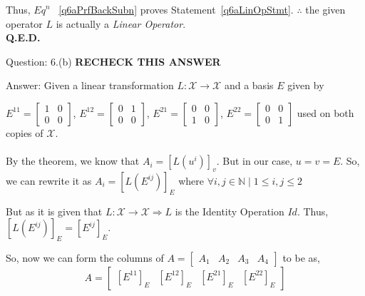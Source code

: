 \documentclass[a4paper]{article}
\begin{document}
\begin{qalist}
		Thus, ${Eq}^{n}$ ~\ref{q6aPrfBackSubn} proves Statement~\ref{q6aLinOpStmt}. $\therefore$ the given operator $L$ is actually a \textit{Linear Operator}. \\ \textbf{Q.E.D.}
		
		\item[Question: 6.(b)] \setcounter{equation}{0} \textbf{RECHECK THIS ANSWER}
		\item[Answer:] Given a linear transformation $L : \mathcal{X} \rightarrow \mathcal{X}$ and a basis $E$ given by 
		
		${E}^{11} = \begin{bmatrix}1 & 0 \\ 0 & 0 \end{bmatrix}$, ${E}^{12} = \begin{bmatrix}0 & 1 \\ 0 & 0 \end{bmatrix}$, ${E}^{21} = \begin{bmatrix}0 & 0 \\ 1 & 0 \end{bmatrix}$, ${E}^{22} = \begin{bmatrix}0 & 0 \\ 0 & 1 \end{bmatrix}$ used on both copies of $\mathcal{X}$.
%		
		\\ \\ By the theorem, we know that ${A}_{i} = {[L({u}^{i})]}_{v}$. But in our case, $u = v = E$. So, we can rewrite it as ${A}_{i} = {[L({E}^{ij})]}_{E}$ where $\forall i,j\in \mathbb{N} \; | \; 1 \leq i,j \leq 2$
		
		But as it is given that $L : \mathcal{X} \rightarrow \mathcal{X} \Rightarrow L$ is the Identity Operation $Id$. Thus, ${[L({E}^{ij})]}_{E} = {[{E}^{ij}]}_{E}$.
		
		So, now we can form the columns of $A = \begin{bmatrix} {A}_{1} & {A}_{2} & {A}_{3} & {A}_{4}\end{bmatrix}$ to be as, 
		\begin{equation}\label{q6bMatRepnForm}
			A = \begin{bmatrix} {[{E}^{11}]}_{E} & {[{E}^{12}]}_{E} & {[{E}^{21}]}_{E} & {[{E}^{22}]}_{E}\end{bmatrix}
		\end{equation}
		

\end{qalist}
\end{document}
